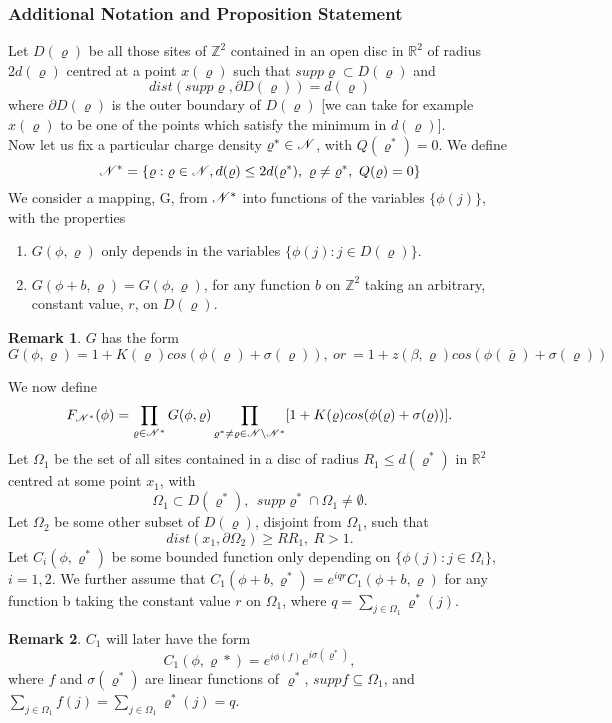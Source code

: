 \documentclass[11pt,reqno]{article}
\theoremstyle{definition}
\newtheorem*{remark}{Remark}
\begin{document}
\subsubsection{Additional Notation and Proposition Statement}
Let $D(\varrho)$ be all those sites of $\mathbb{Z}^2$ contained in an open disc in $\mathbb{R}^2$ of radius $2d(\varrho)$ centred at a point $x(\varrho)$ such that $supp\varrho \subset D(\varrho)$ and
$$
dist(supp\varrho, \partial D(\varrho)) = d(\varrho)
$$
where $\partial D(\varrho)$ is the outer boundary of $D(\varrho)$ [we can take for example $x(\varrho)$ to be one of the points which satisfy the minimum in $d(\varrho)$].\\
Now let us fix a particular charge density $\varrho^* \in \mathscr{N}$, with $Q(\varrho^*)=0$.
We define 
$$
\mathscr{N}^* = \{\varrho: \varrho \in \mathscr{N}, d(\varrho)\leq 2d(\varrho^*),\ \varrho \neq \varrho^*,\  Q(\varrho)=0\}
$$
We consider a mapping, G, from $\mathscr{N}^*$ into functions of the variables $\{ \phi(j) \}$, with the properties
\begin{enumerate}
\item $G(\phi, \varrho)$ only depends in the variables $\{ \phi(j): j \in D(\varrho) \}$.
\item $G(\phi + b, \varrho) = G(\phi, \varrho)$, for any function $b$ on $\mathbb{Z}^2$ taking an arbitrary, constant value, $r$, on $D(\varrho)$.
\end{enumerate}

\begin{remark}
$G$ has the form 
$$G(\phi, \varrho) = 1+K(\varrho)cos(\phi(\varrho) + \sigma(\varrho)),\ or\ =1+z(\beta, \varrho)cos(\phi(\bar{\varrho}) + \sigma(\varrho))
$$
\end{remark}
We now define
$$
F_{\mathscr{N}^*}(\phi) = \prod_{\varrho \in \mathscr{N}^*} G(\phi, \varrho)
\prod_{\varrho^* \neq \varrho \in \mathscr{N} \setminus \mathscr{N}^*}[1+K(\varrho)cos(\phi(\varrho) + \sigma(\varrho))].
$$
Let $\Omega_1$ be the set of all sites contained in a disc of radius $R_1 \leq d(\varrho^*)$ in $\mathbb{R}^2$ centred at some point $x_1$, with
$$
\Omega_1 \subset D(\varrho^*), \ \ supp\varrho^* \cap \Omega_1 \neq \emptyset.
$$
Let $\Omega_2$ be some other subset of $D(\varrho)$, disjoint from $\Omega_1$, such that
$$
dist(x_1, \partial\Omega_2) \geq RR_1, \ R > 1.
$$ 
Let $C_i(\phi, \varrho^*)$ be some bounded function only depending on $\{ \phi(j): j \in \Omega_i \}$, $i=1,2$. We further assume that $C_1(\phi+b, \varrho^*) = e^{iqr}C_1(\phi+b, \varrho)$ for any function b taking the constant value $r$ on $\Omega_1$, where $q=\sum_{j \in \Omega_1}\varrho^*(j)$.
\begin{remark}
$C_1$ will later have the form 
$$
C_1(\phi, \varrho*) = e^{i\phi(f)}e^{i\sigma(\varrho^*)},
$$
where $f$ and $\sigma(\varrho^*)$ are linear functions of $\varrho^*$, $suppf\subseteq\Omega_1$, and $\sum_{j \in \Omega_1}f(j) = \sum_{j \in \Omega_1}\varrho^*(j) = q$.
\end{remark}
\end{document}
